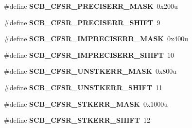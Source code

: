 \begin{DoxyCompactItemize}
\item 
\hypertarget{group___s_c_b___register___masks_gad21d8229a2959c0d133ca27e7341e7b9}{}\#define {\bfseries S\+C\+B\+\_\+\+C\+F\+S\+R\+\_\+\+P\+R\+E\+C\+I\+S\+E\+R\+R\+\_\+\+M\+A\+S\+K}~0x200u\label{group___s_c_b___register___masks_gad21d8229a2959c0d133ca27e7341e7b9}

\item 
\hypertarget{group___s_c_b___register___masks_ga325731a90504b3d9ca4a82919d1661a8}{}\#define {\bfseries S\+C\+B\+\_\+\+C\+F\+S\+R\+\_\+\+P\+R\+E\+C\+I\+S\+E\+R\+R\+\_\+\+S\+H\+I\+F\+T}~9\label{group___s_c_b___register___masks_ga325731a90504b3d9ca4a82919d1661a8}

\item 
\hypertarget{group___s_c_b___register___masks_ga9d1f9a2c82c7a6bbc45d5d898cc59f95}{}\#define {\bfseries S\+C\+B\+\_\+\+C\+F\+S\+R\+\_\+\+I\+M\+P\+R\+E\+C\+I\+S\+E\+R\+R\+\_\+\+M\+A\+S\+K}~0x400u\label{group___s_c_b___register___masks_ga9d1f9a2c82c7a6bbc45d5d898cc59f95}

\item 
\hypertarget{group___s_c_b___register___masks_gae3f177302080e980a73f0c37e54671e3}{}\#define {\bfseries S\+C\+B\+\_\+\+C\+F\+S\+R\+\_\+\+I\+M\+P\+R\+E\+C\+I\+S\+E\+R\+R\+\_\+\+S\+H\+I\+F\+T}~10\label{group___s_c_b___register___masks_gae3f177302080e980a73f0c37e54671e3}

\item 
\hypertarget{group___s_c_b___register___masks_gaf2a037f74f527143a134960fd2b2cfe0}{}\#define {\bfseries S\+C\+B\+\_\+\+C\+F\+S\+R\+\_\+\+U\+N\+S\+T\+K\+E\+R\+R\+\_\+\+M\+A\+S\+K}~0x800u\label{group___s_c_b___register___masks_gaf2a037f74f527143a134960fd2b2cfe0}

\item 
\hypertarget{group___s_c_b___register___masks_ga6841fcf2ed6317c5d5d5849851c06808}{}\#define {\bfseries S\+C\+B\+\_\+\+C\+F\+S\+R\+\_\+\+U\+N\+S\+T\+K\+E\+R\+R\+\_\+\+S\+H\+I\+F\+T}~11\label{group___s_c_b___register___masks_ga6841fcf2ed6317c5d5d5849851c06808}

\item 
\hypertarget{group___s_c_b___register___masks_gae10c95d9708537c20cf74c1cc7e34b47}{}\#define {\bfseries S\+C\+B\+\_\+\+C\+F\+S\+R\+\_\+\+S\+T\+K\+E\+R\+R\+\_\+\+M\+A\+S\+K}~0x1000u\label{group___s_c_b___register___masks_gae10c95d9708537c20cf74c1cc7e34b47}

\item 
\hypertarget{group___s_c_b___register___masks_gaab623b430a0c5da42375446bff03eb76}{}\#define {\bfseries S\+C\+B\+\_\+\+C\+F\+S\+R\+\_\+\+S\+T\+K\+E\+R\+R\+\_\+\+S\+H\+I\+F\+T}~12\label{group___s_c_b___register___masks_gaab623b430a0c5da42375446bff03eb76}


\end{DoxyCompactItemize}
